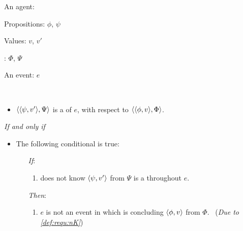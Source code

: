 \begin{note}
  \begin{definition}[A \requ{0}]
    \label{def:requ}
    \begin{itemize*}[noitemsep, label=\(\circ\)]
    \item
      An agent: \vAgent{}
    \item
      Propositions: \(\phi\), \(\psi\)
    \item
      Values: \(v\), \(v'\)
    \item
      : \(\Phi\), \(\Psi\)
    \item
      An event: \(e\)
    \item
      \mbox{ }
    \end{itemize*}

    \begin{itemize}
    \item
      \(\langle \langle \psi, v' \rangle, \Psi \rangle\) is a \emph{\requ{}} of \(e\), with respect to \(\langle \langle \phi, v \rangle, \Phi \rangle\).
    \end{itemize}

    \emph{If and only if}

    \begin{itemize}
    \item
      The following conditional is true:
      \begin{itemize}
      \item[\emph{If}:]
        \begin{enumerate}[label=\alph*., ref=(\alph*), series=requDefSeries]
        \item
          \label{def:requ:nK}
          \vAgent{} does not know \(\langle \psi, v' \rangle\) from \(\Psi\) is a \fc{} throughout \(e\).
        \end{enumerate}
      \item[\emph{Then}:]
        \begin{enumerate}[label=\alph*., ref=(\alph*), resume*=requDefSeries]
        \item
          \label{def:requ:nC}
          \(e\) is not an event in which \vAgent{} is concluding \(\langle \phi, v \rangle\) from \(\Phi\).\newline
          \mbox{ }\hfill(\emph{Due to \ref{def:requ:nK}})
        \end{enumerate}
      \end{itemize}
    \end{itemize}
    \vspace{-\baselineskip}
  \end{definition}
\end{note}

